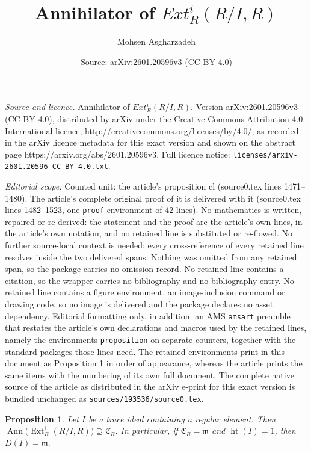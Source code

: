 \documentclass[10pt,a4paper]{amsart}
\title{Annihilator of $Ext^i_R(R/I,R)$}
\author{Mohsen Asgharzadeh}
\date{Source: arXiv:2601.20596v3 (CC BY 4.0)}
\newtheorem{proposition}{Proposition}
\DeclareMathOperator{\Ann}{Ann}\DeclareMathOperator{\ann}{Ann}
\DeclareMathOperator{\Ext}{Ext}
\DeclareMathOperator{\Ht}{ht}
\begin{document}
\maketitle

\noindent\emph{Source and licence.} Annihilator of $Ext^i_R(R/I,R)$. Version arXiv:2601.20596v3 (CC BY 4.0), distributed by arXiv under the Creative Commons Attribution 4.0 International licence, http://creativecommons.org/licenses/by/4.0/, as recorded in the arXiv licence metadata for this exact version and shown on the abstract page https://arxiv.org/abs/2601.20596v3. Full licence notice: \texttt{licenses/arxiv-2601.20596-CC-BY-4.0.txt}.\par\smallskip

\noindent\textit{Editorial scope.} Counted unit: the article's proposition cl (source0.tex lines 1471--1480). The article's complete original proof of it is delivered with it (source0.tex lines 1482--1523, one \texttt{proof} environment of 42 lines). No mathematics is written, repaired or re-derived: the statement and the proof are the article's own lines, in the article's own notation, and no retained line is substituted or re-flowed.  No further source-local context is needed: every cross-reference of every retained line resolves inside the two delivered spans.  Nothing was omitted from any retained span, so the package carries no omission record.  No retained line contains a citation, so the wrapper carries no bibliography and no bibliography entry.  No retained line contains a figure environment, an image-inclusion command or drawing code, so no image is delivered and the package declares no asset dependency.  Editorial formatting only, in addition: an AMS \texttt{amsart} preamble that restates the article's own declarations and macros used by the retained lines, namely the environments \texttt{proposition} on separate counters, together with the standard packages those lines need.  The retained environments print in this document as Proposition 1 in order of appearance, whereas the article prints the same items with the numbering of its own full document.  The complete native source of the article as distributed in the arXiv e-print for this exact version is bundled unchanged as \texttt{sources/193536/source0.tex}.
\begin{proposition}\label{cl}
	Let $I$ be a trace ideal containing a regular element. Then
	\(
	\Ann\!\big(\Ext^1_R(R/I, R)\big) \supseteq \mathfrak{C}_R.
	\)
	In particular, if $\mathfrak{C}_R=\mathfrak{m}$ and $\Ht(I)=1$, then
	\(
	D(I)=\mathfrak{m}.
	\)
\end{proposition}
\end{document}
